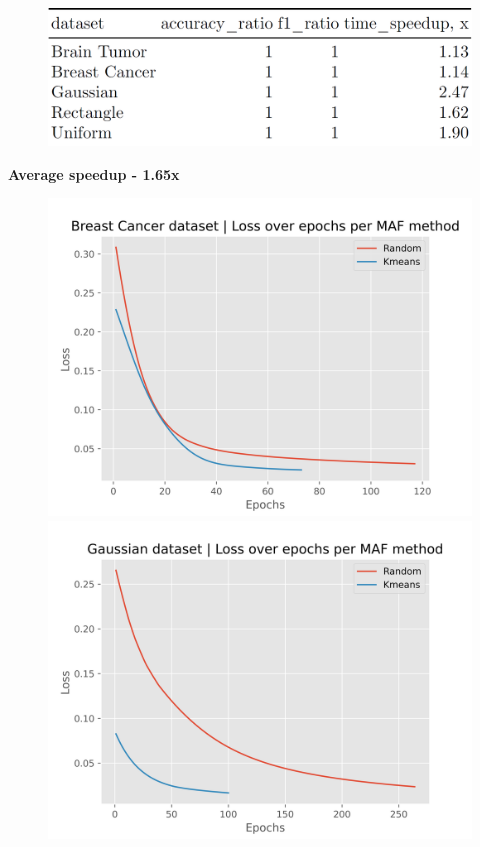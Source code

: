 \documentclass[aspectratio=169]{beamer}
\begin{document}
\begin{frame}
\begin{figure}
    \centering
    \includegraphics[width=1\linewidth]{../../fig/speedup_groupby.png}
\end{figure}
\textbf{Average speedup - 1.65x}
\end{frame}

\begin{frame}
\begin{figure}
    \centering
    \begin{minipage}{0.49\textwidth}
        \includegraphics[width=\linewidth]{../../fig/breast-cancer-wisconsin_loss.png}
    \end{minipage}\hfill
    \begin{minipage}{0.49\textwidth}
        \includegraphics[width=\linewidth]{../../fig/gaussian_df_loss.png}

\end{minipage}
\end{figure}
\end{frame}
\end{document}
